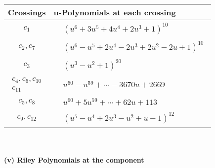 \documentclass[1p]{elsarticle_modified}
\theoremstyle{definition}
\begin{document}
\begin{tabular}{m{50pt}|m{274pt}}
Crossings & \hspace{64pt}u-Polynomials at each crossing \\
\hline $$\begin{aligned}c_{1}\end{aligned}$$&$\begin{aligned}
&(u^6+3 u^5+4 u^4+2 u^3+1)^{10}
\end{aligned}$\\
\hline $$\begin{aligned}c_{2},c_{7}\end{aligned}$$&$\begin{aligned}
&(u^6- u^5+2 u^4-2 u^3+2 u^2-2 u+1)^{10}
\end{aligned}$\\
\hline $$\begin{aligned}c_{3}\end{aligned}$$&$\begin{aligned}
&(u^3- u^2+1)^{20}
\end{aligned}$\\
\hline $$\begin{aligned}c_{4},c_{6},c_{10}\\c_{11}\end{aligned}$$&$\begin{aligned}
&u^{60}- u^{59}+\cdots-3670 u+2669
\end{aligned}$\\
\hline $$\begin{aligned}c_{5},c_{8}\end{aligned}$$&$\begin{aligned}
&u^{60}+5 u^{59}+\cdots+62 u+113
\end{aligned}$\\
\hline $$\begin{aligned}c_{9},c_{12}\end{aligned}$$&$\begin{aligned}
&(u^5- u^4+2 u^3- u^2+u-1)^{12}
\end{aligned}$\\
\hline
\end{tabular}\\~\\
\newpage\renewcommand{\arraystretch}{1}
\flushleft \textbf{(v) Riley Polynomials at the component}\newline \\
\end{document}
